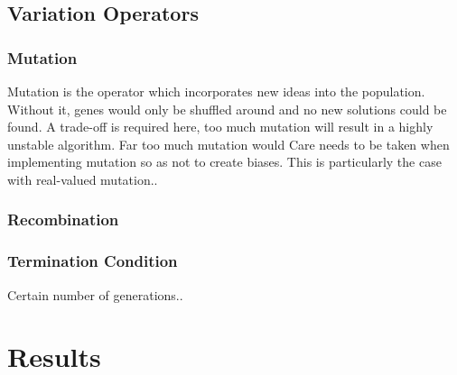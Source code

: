 \documentclass{article}
\begin{document}

\subsection{Variation Operators}
\subsubsection{Mutation}
\label{mutation}
Mutation is the operator which incorporates new ideas into the population. Without it, genes would only be shuffled around and no new solutions could be found. %
A trade-off is required here, too much mutation will result in a highly unstable algorithm. Far too much mutation would %
Care needs to be taken when implementing mutation so as not to create biases. This is particularly the case with real-valued mutation.. %

\subsubsection{Recombination}


\subsubsection{Termination Condition}
Certain number of generations..

\section{Results} %

\end{document}
